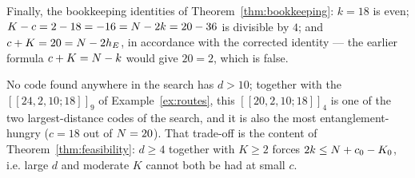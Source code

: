 \begin{example}
Finally, the bookkeeping identities of Theorem~\ref{thm:bookkeeping}:
$k=18$ is even; $K-c=2-18=-16=N-2k=20-36$ is divisible by $4$; and
$c+K=20=N-2h_E$, in accordance with the corrected identity --- the
earlier formula $c+K=N-k$ would give $20=2$, which is false.

No code found anywhere in the search has $d>10$; together with the
$[[24,2,10;18]]_9$ of Example~\ref{ex:routes}, this $[[20,2,10;18]]_4$ is
one of the two largest-distance codes of the search, and it is also the
most entanglement-hungry ($c=18$ out of $N=20$). That trade-off is
the content of Theorem~\ref{thm:feasibility}: $d\ge4$ together with
$K\ge2$ forces $2k\le N+c_0-K_0$, i.e. large $d$ and moderate $K$ cannot
both be had at small $c$.
\end{example}
